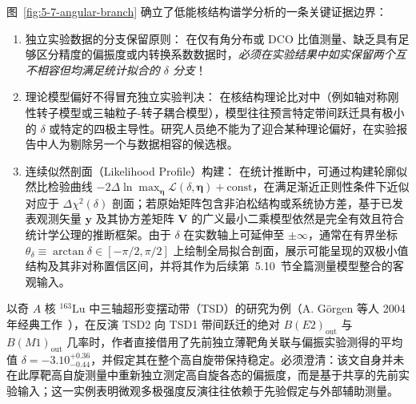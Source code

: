 图~\ref{fig:5-7-angular-branch} 确立了低能核结构谱学分析的一条关键证据边界：
\begin{enumerate}
\item 独立实验数据的分支保留原则：
在仅有角分布或 DCO 比值测量、缺乏具有足够区分精度的偏振度或内转换系数数据时，\emph{必须在实验结果中如实保留两个互不相容但均满足统计拟合的 $\delta$ 分支}！
\item 理论模型偏好不得冒充独立实验判决：
在核结构理论比对中（例如轴对称刚性转子模型或三轴粒子-转子耦合模型），模型往往预言特定带间跃迁具有极小的 $\delta$ 或特定的四极主导性。研究人员绝不能为了迎合某种理论偏好，在实验报告中人为剔除另一个与数据相容的候选根。
\item 连续似然剖面（Likelihood Profile）构建：
在统计推断中，可通过构建轮廓似然比检验曲线 $-2\Delta\ln \max_{\boldsymbol{\eta}} \mathcal{L}(\delta, \boldsymbol{\eta}) + \text{const}$，在满足渐近正则性条件下近似对应于 $\Delta\chi^2(\delta)$ 剖面；若原始矩阵包含非泊松结构或系统协方差，基于已发表观测矢量 $\mathbf{y}$ 及其协方差矩阵 $\mathbf{V}$ 的广义最小二乘模型依然是完全有效且符合统计学公理的推断框架。由于 $\delta$ 在实数轴上可延伸至 $\pm \infty$，通常在有界坐标 $\theta_\delta \equiv \arctan\delta \in [-\pi/2, \pi/2]$ 上绘制全局拟合剖面，展示可能呈现的双极小值结构及其非对称置信区间，并将其作为后续第~5.10~节全篇测量模型整合的客观输入。
\end{enumerate}

以奇 $A$ 核 $^{163}\mathrm{Lu}$ 中三轴超形变摆动带（TSD）的研究为例（A. Görgen 等人 2004 年经典工作~\cite{campaign-g07-gorgen-2004-163lu-quadrupole-moments}），在反演 TSD2 向 TSD1 带间跃迁的绝对 $B(E2)_{\mathrm{out}}$ 与 $B(M1)_{\mathrm{out}}$ 几率时，作者直接借用了先前独立薄靶角关联与偏振实验测得的平均值 $\delta = -3.10^{+0.36}_{-0.44}$，并假定其在整个高自旋带保持稳定。必须澄清：该文自身并未在此厚靶高自旋测量中重新独立测定高自旋各态的偏振度，而是基于共享的先前实验输入；这一实例表明微观多极强度反演往往依赖于先验假定与外部辅助测量。